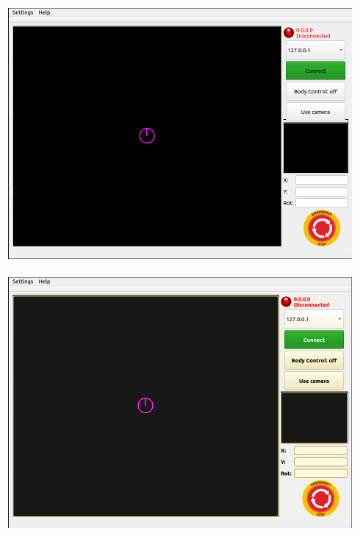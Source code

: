 \begin{figure}[!htbp]
	\centering

	\begin{subfigure}{0.49\textwidth}
		\includegraphics[width=\textwidth]{img/default-app.png}
	\end{subfigure}
	\hfill
	\begin{subfigure}{0.49\textwidth}
		\includegraphics[width=\textwidth]{img/coffee-app.png}
	\end{subfigure}

	\vspace{\baselineskip}


\end{figure}
